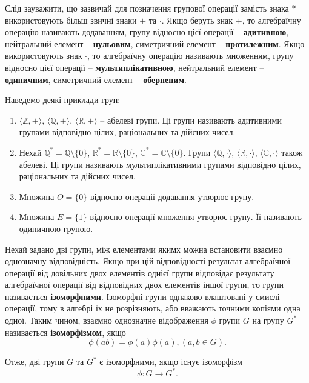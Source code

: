 Слід зауважити, що зазвичай для позначення групової операції замість знака $*$ використовують більш звичні знаки $+$ та $\cdot$. Якщо беруть знак $+$, то алгебраїчну операцію називають додаванням, групу відносно цієї операції -- \textbf{адитивною}, нейтральний елемент -- \textbf{нульовим}, симетричний елемент -- \textbf{протилежним}. Якщо використовують знак $\cdot$, то алгебраїчну операцію називають множенням, групу відносно цієї операції -- \textbf{мультиплікативною}, нейтральний елемент -- \textbf{одиничним}, симетричний елемент -- \textbf{оберненим}. 

Наведемо деякі приклади груп:
\begin{enumerate}[noitemsep,partopsep=0pt,topsep=0pt,parsep=0pt]
\item $\langle \mathbb{Z}, + \rangle$, $\langle \mathbb{Q}, + \rangle$, $\langle \mathbb{R}, + \rangle$ -- абелеві групи. Ці групи називають адитивними групами відповідно цілих, раціональних та дійсних чисел.

\item Нехай $\mathbb{Q}^*=\mathbb{Q} \setminus \{0\}$, $\mathbb{R}^*=\mathbb{R} \setminus \{0\}$, $\mathbb{C}^*=\mathbb{C} \setminus \{0\}$. Групи $\langle \mathbb{Q}, \cdot \rangle$, $\langle \mathbb{R}, \cdot \rangle$, $\langle \mathbb{C}, \cdot \rangle$ також абелеві. Ці групи називають мультиплікативними групами відповідно цілих, раціональних та дійсних чисел.

\item Множина $O=\{ 0 \}$ відносно операції додавання утворює групу.

\item Множина $E=\{ 1 \}$ відносно операції множення утворює групу. Її називають одиничною групою.
\end{enumerate}



Нехай задано дві групи, між елементами якимх можна встановити взаємно однозначну відповідність. Якщо при цій відповідності результат алгебраїчної операції від довільних двох елементів однієї групи відповідає результату алгебраїчної операції від відповідних двох елементів іншої групи, то групи називається \textbf{ізоморфними}. Ізоморфні групи однаково влаштовані у смислі операції, тому в алгебрі їх не розрізняють, або вважають точними копіями одна одної. Таким чином, взаємно однозначне відображення $\phi$ групи $G$ на групу $G^*$ називається \textbf{ізоморфізмом}, якщо
\[
\phi (ab) = \phi(a) \phi(a) , (a,b \in G).
\]

Отже, дві групи $G$ та $G^*$ є ізоморфними, якщо існує ізоморфізм
\[
\phi: G \to G^*.
\]

